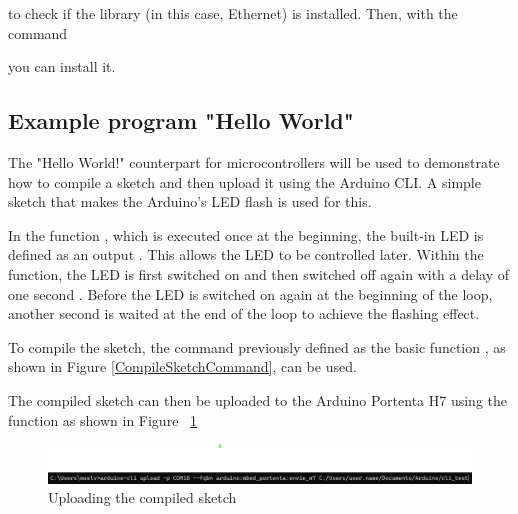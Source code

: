 
to check if the library (in this case, Ethernet) is installed. Then, with the command

	
you can install it.

\subsection{Example program "Hello World"}
The "Hello World!" counterpart for microcontrollers will be used to demonstrate how to compile a sketch and then upload it using the Arduino CLI. A simple sketch that makes the Arduino's LED flash is used for this.

\begin{code}

\end{code}

In the function , which is executed once at the beginning, the built-in LED is defined as an output . This allows the LED to be controlled later. Within the  function, the LED is first switched on  and then switched off again with a delay of one second . Before the LED is switched on again at the beginning of the loop, another second is waited at the end of the loop to achieve the flashing effect.

To compile the sketch, the command previously defined as the basic function , as shown in Figure \ref{CompileSketchCommand}, can be used.

The compiled sketch can then be uploaded to the Arduino Portenta H7 using the function  as shown in Figure ~\ref{UploadSketchCLI}

\begin{figure}
	\begin{center}
		\includegraphics[width=0.7\linewidth]{Images/ArduinoCLI/UploadSketch.png}
		\caption{Uploading the compiled sketch}
		\label{UploadSketchCLI}
	\end{center}
\end{figure}


